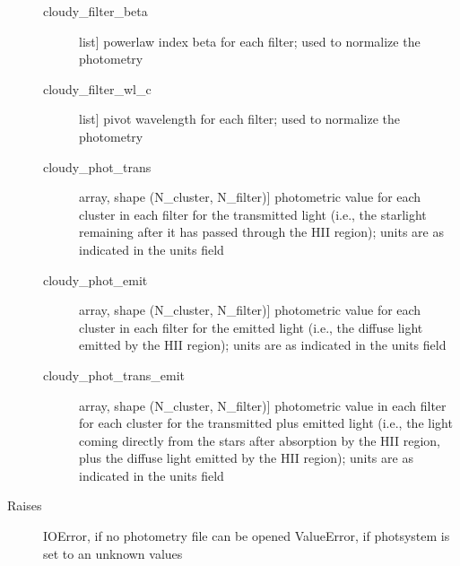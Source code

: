 \documentclass[letterpaper,10pt,english]{sphinxmanual}
\begin{document}
\begin{fulllineitems}
\begin{description}
\begin{description}
\item[{cloudy\_filter\_beta}] \leavevmode{[}list{]}
powerlaw index beta for each filter; used to normalize the
photometry

\item[{cloudy\_filter\_wl\_c}] \leavevmode{[}list{]}
pivot wavelength for each filter; used to normalize the photometry

\item[{cloudy\_phot\_trans}] \leavevmode{[}array, shape (N\_cluster, N\_filter){]}
photometric value for each cluster in each filter for the
transmitted light (i.e., the starlight remaining after it has
passed through the HII region); units are as indicated in
the units field

\item[{cloudy\_phot\_emit}] \leavevmode{[}array, shape (N\_cluster, N\_filter){]}
photometric value for each cluster in each filter for the
emitted light (i.e., the diffuse light emitted by the HII
region); units are as indicated in the units field

\item[{cloudy\_phot\_trans\_emit}] \leavevmode{[}array, shape (N\_cluster, N\_filter){]}
photometric value in each filter for each cluster for the
transmitted plus emitted light (i.e., the light coming
directly from the stars after absorption by the HII region,
plus the diffuse light emitted by the HII region); units are as
indicated in the units field

\end{description}

\item[{Raises}] \leavevmode
IOError, if no photometry file can be opened
ValueError, if photsystem is set to an unknown values

\end{description}

\end{fulllineitems}

\end{document}
